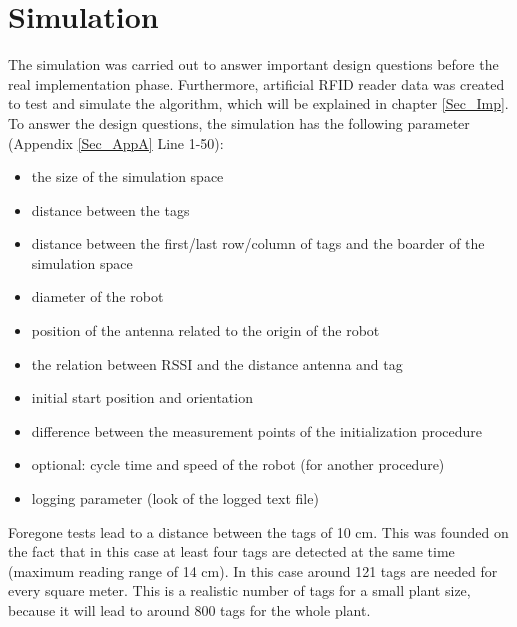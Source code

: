 \section{Simulation} \label{Sec_Sim}
The simulation was carried out to answer important design questions before the real implementation phase. Furthermore, artificial RFID reader data was created to test and simulate the algorithm, which will be explained in chapter \ref{Sec_Imp}. \\
To answer the design questions, the simulation has the following parameter (Appendix \ref{Sec_AppA} Line 1-50):\begin{itemize}
	\item the size of the simulation space
	\item distance between the tags
	\item distance between the first/last row/column of tags and the boarder of the simulation space
	\item diameter of the robot
	\item position of the antenna related to the origin of the robot
	\item the relation between RSSI and the distance antenna and tag
	\item initial start position and orientation
	\item difference between the measurement points of the initialization procedure
	\item optional: cycle time and speed of the robot (for another procedure)
	\item logging parameter (look of the logged text file)
\end{itemize}	
Foregone tests lead to a distance between the tags of 10 cm. This was founded on the fact that in this case at least four tags are detected at the same time (maximum reading range of 14 cm). In this case around 121 tags are needed for every square meter. This is a realistic number of tags for a small plant size, because it will lead to around 800 tags for the whole plant. \\

